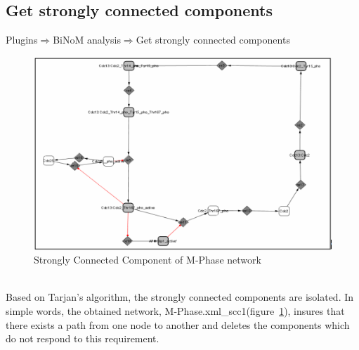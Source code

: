 \subsection{Get strongly connected components}
Plugins$\Rightarrow$BiNoM analysis$\Rightarrow$Get strongly connected components\\
\begin{figure}
\centering
\includegraphics[width=14 cm]{graphics/Strongly_Connected_Component_of_M-Phase_network.png}
\caption{Strongly Connected Component of M-Phase network}
\label{Strongly_Connected_Component_of M-Phase_network}
\end{figure}
\\Based on Tarjan’s algorithm\cite{tarjan1972depth}, the strongly connected components are isolated. In simple words, the obtained network, M-Phase.xml\_scc1(figure~\ref{Strongly_Connected_Component_of M-Phase_network}), insures that there exists a path from one node to another and deletes the components which do not respond to this requirement.

